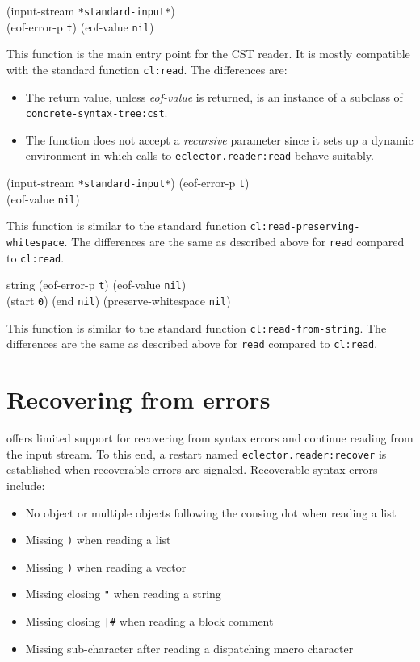  {\optional (input-stream \texttt{*standard-input*})\\
  (eof-error-p \texttt{t})
  (eof-value \texttt{nil})}

This function is the main entry point for the CST reader.  It is
mostly compatible with the standard \commonlisp{} function
\texttt{cl:read}.  The differences are:

\begin{itemize}
\item The return value, unless \textit{eof-value} is returned, is an
  instance of a subclass of \texttt{concrete-syntax-tree:cst}.
\item The function does not accept a \textit{recursive} parameter
  since it sets up a dynamic environment in which calls to
  \texttt{eclector.reader:read} behave suitably.
\end{itemize}

 {\optional (input-stream \texttt{*standard-input*})
  (eof-error-p \texttt{t})\\
  (eof-value \texttt{nil})}

This function is similar to the standard \commonlisp{} function
\texttt{cl:read-preserving-whitespace}.  The differences are the same
as described above for \texttt{read} compared to \texttt{cl:read}.

 {string \optional
  (eof-error-p \texttt{t})
  (eof-value \texttt{nil})\\
  \key
  (start \texttt{0})
  (end \texttt{nil})
  (preserve-whitespace \texttt{nil})}

This function is similar to the standard \commonlisp{} function
\texttt{cl:read-from-string}.  The differences are the same as
described above for \texttt{read} compared to \texttt{cl:read}.

\section{Recovering from errors}
\label{sec:recovering-from-errors}

\sysname{} offers limited support for recovering from syntax errors
and continue reading from the input stream.  To this end, a restart
named \texttt{eclector.reader:recover} is established when recoverable
errors are signaled.  Recoverable syntax errors include:

\begin{itemize}
\item No object or multiple objects following the consing dot when
  reading a list
\item Missing \texttt{)} when reading a list
\item Missing \texttt{)} when reading a vector
\item Missing closing \texttt{"} when reading a string
\item Missing closing \texttt{|\#} when reading a block comment
\item Missing sub-character after reading a dispatching macro
  character
\end{itemize}


